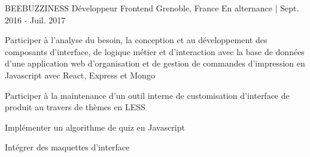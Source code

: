 \begin{cventries}
  \cventry
  	{BEEBUZZINESS} %
    {Développeur Frontend} %
    {Grenoble, France} %
    {En alternance | Sept. 2016 - Juil. 2017} %
    {
      \begin{cvitems} %
        \item {Participer à l’analyse du besoin, la conception et au développement des composants d’interface, de logique métier et d’interaction avec la base de données d'une application web d'organisation et de gestion de commandes d'impression en Javascript avec React, Express et Mongo}
        \item {Participer à la maintenance d’un outil interne de customisation d’interface de produit au travers de thèmes en LESS}
        \item {Implémenter un algorithme de quiz en Javascript}
        \item {Intégrer des maquettes d’interface}
      \end{cvitems}
    }

\end{cventries}
